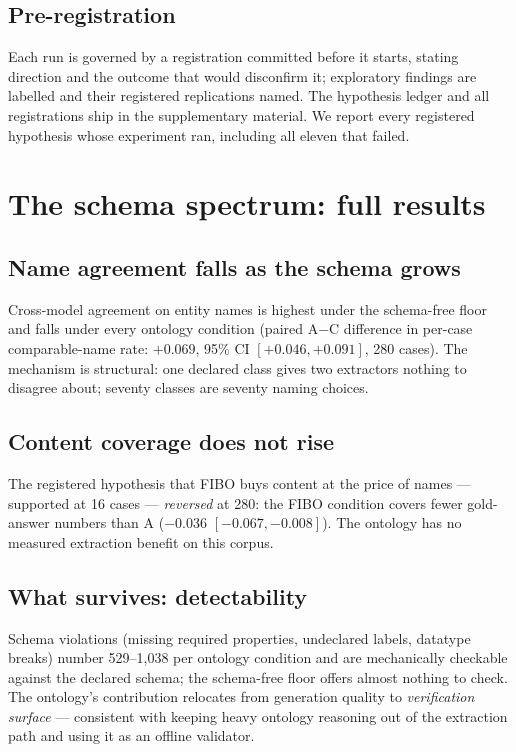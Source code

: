 \documentclass{article}
\begin{document}
\subsection{Pre-registration}

Each run is governed by a registration committed before it starts, stating
direction and the outcome that would disconfirm it; exploratory findings are
labelled and their registered replications named. The hypothesis ledger and
all registrations ship in the supplementary material. We report every registered hypothesis whose experiment ran, including
all eleven that failed.

\section{The schema spectrum: full results}\label{app:part1}

\subsection{Name agreement falls as the schema grows}

Cross-model agreement on entity names is highest under the schema-free
floor and falls under every ontology condition (paired A$-$C difference in
per-case comparable-name rate: $+0.069$, 95\% CI $[+0.046, +0.091]$, 280
cases). The mechanism is structural: one declared class gives two extractors
nothing to disagree about; seventy classes are seventy naming choices.

\subsection{Content coverage does not rise}

The registered hypothesis that FIBO buys content at the price of names ---
supported at 16 cases --- \emph{reversed} at 280: the FIBO condition covers fewer
gold-answer numbers than A ($-0.036$ $[-0.067, -0.008]$). The ontology has
no measured extraction benefit on this corpus.

\subsection{What survives: detectability}

Schema violations (missing required properties, undeclared labels, datatype
breaks) number 529--1,038 per ontology condition and are mechanically
checkable against the declared schema; the schema-free floor offers almost
nothing to check. The ontology's contribution relocates from generation
quality to \emph{verification surface} --- consistent with keeping heavy
ontology reasoning out of the extraction path and using it as an offline
validator.
\end{document}
